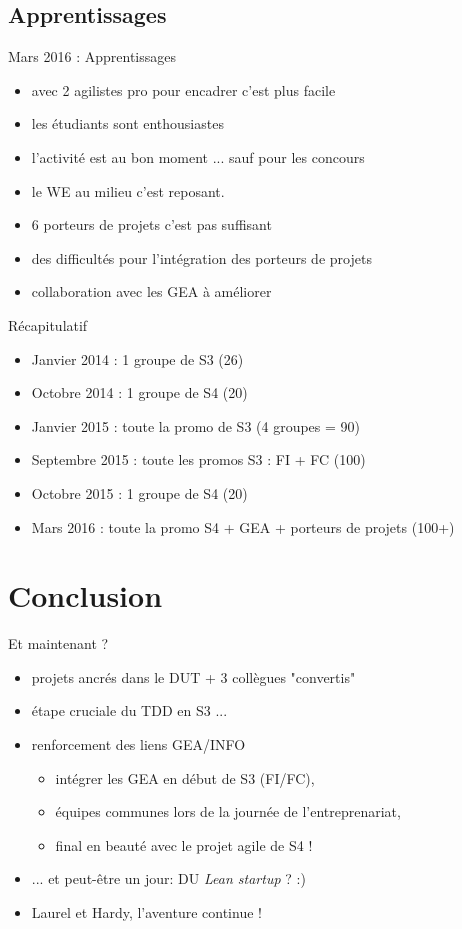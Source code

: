 \documentclass{beamer}
\begin{document}
\subsection{Apprentissages}
\begin{frame}{Mars 2016 : Apprentissages}
  \begin{itemize}
    \item avec 2 agilistes pro pour encadrer c'est plus facile
    \item les étudiants sont enthousiastes
    \item l'activité est au bon moment ... sauf pour les concours
    \item le WE au milieu c'est reposant.
    \item 6 porteurs de projets c'est pas suffisant
    \item des difficultés pour l'intégration des porteurs de projets
    \item collaboration avec les GEA à améliorer
  \end{itemize}
\end{frame}

\begin{frame}{Récapitulatif}
  \begin{itemize}
    \item Janvier 2014 : 1 groupe de S3 (26)
    \item Octobre 2014 : 1 groupe de S4 (20)
    \item Janvier 2015 : toute la promo de S3 (4 groupes = 90)
    \item Septembre 2015 : toute les promos S3 : FI + FC (100)
    \item Octobre 2015 : 1 groupe de S4 (20)
    \item Mars 2016 : toute la promo S4 + GEA + porteurs de projets (100+)
  \end{itemize}
\end{frame}

\section{Conclusion}
\begin{frame}{Et maintenant ?}
  \begin{itemize}
    \item projets ancrés dans le DUT + 3 collègues "convertis"
    \item étape cruciale du TDD en S3 ...
    \item renforcement des liens GEA/INFO
      \begin{itemize}
        \item intégrer les GEA en début de S3 (FI/FC),
        \item équipes communes lors de la journée de l'entreprenariat,
        \item final en beauté avec le projet agile de S4 !
      \end{itemize}
    \item ... et peut-être un jour: DU \emph{Lean startup} ? :)
    \item Laurel et Hardy, l'aventure continue !
  \end{itemize}
\end{frame}
\end{document}
